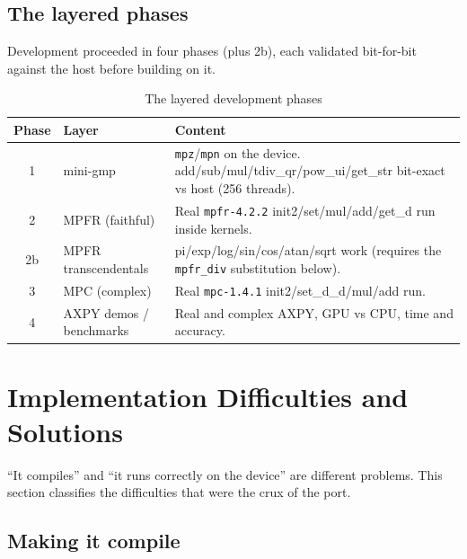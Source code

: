 \documentclass[uplatex,dvipdfmx,a4paper,11pt]{jsarticle}
\newcommand{\code}[1]{\texttt{#1}}
\begin{document}
\subsection{The layered phases}

Development proceeded in four phases (plus 2b), each validated bit-for-bit
against the host before building on it.

\begin{table}[h]
\centering
\caption{The layered development phases}
\begin{tabular}{clp{7.5cm}}
\toprule
Phase & Layer & Content \\
\midrule
1  & mini-gmp & \code{mpz}/\code{mpn} on the device. add/sub/mul/tdiv\_qr/pow\_ui/get\_str bit-exact vs host (256 threads).\\
2  & MPFR (faithful) & Real \code{mpfr-4.2.2} init2/set/mul/add/get\_d run inside kernels.\\
2b & MPFR transcendentals & pi/exp/log/sin/cos/atan/sqrt work (requires the \code{mpfr\_div} substitution below).\\
3  & MPC (complex) & Real \code{mpc-1.4.1} init2/set\_d\_d/mul/add run.\\
4  & AXPY demos / benchmarks & Real and complex AXPY, GPU vs CPU, time and accuracy.\\
\bottomrule
\end{tabular}
\end{table}

\section{Implementation Difficulties and Solutions}
\label{sec:difficulties}

``It compiles'' and ``it runs correctly on the device'' are different problems.
This section classifies the difficulties that were the crux of the port.

\subsection{Making it compile}
\end{document}
